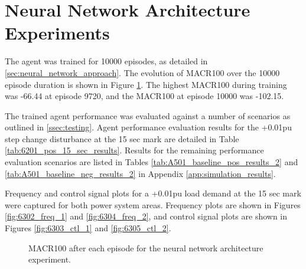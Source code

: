 \section{Neural Network Architecture Experiments}
The agent was trained for 10000 episodes, as detailed in \textsection \ref{sec:neural_network_approach}. The evolution of MACR100 over the 10000 episode duration is shown in Figure \ref{fig:6301_average_reward}. The highest MACR100 during training was -66.44 at episode 9720, and the MACR100 at episode 10000 was -102.15.

The trained agent performance was evaluated against a number of scenarios as outlined in \textsection \ref{ssec:testing}. Agent performance evaluation results for the +0.01pu step change disturbance at the 15 sec mark are detailed in Table \ref{tab:6201_pos_15_sec_results}. Results for the remaining performance evaluation scenarios are listed in Tables \ref{tab:A501_baseline_pos_results_2} and \ref{tab:A501_baseline_neg_results_2} in Appendix \ref{app:simulation_results}.

Frequency and control signal plots for a +0.01pu load demand at the 15 sec mark were captured for both power system areas. Frequency plots are shown in Figures \ref{fig:6302_freq_1} and \ref{fig:6304_freq_2}, and control signal plots are shown in Figures \ref{fig:6303_ctl_1} and \ref{fig:6305_ctl_2}.

\begin{figure}[h]
	\centering
	
	\caption{MACR100 after each episode for the neural network architecture experiment.}\label{fig:6301_average_reward}
\end{figure}



